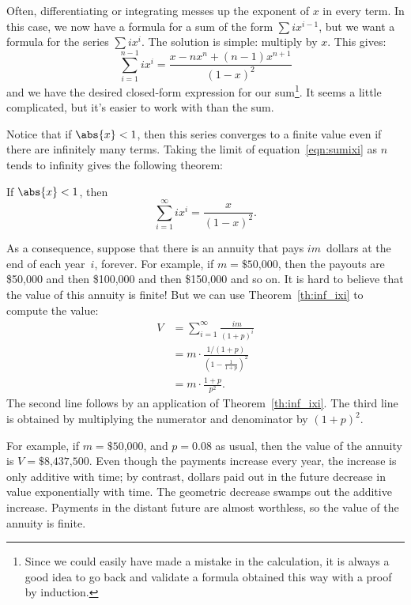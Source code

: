 Often, differentiating or integrating messes up the exponent of $x$ in
every term.  In this case, we now have a formula for a sum of the form
$\sum i x^{i-1}$, but we want a formula for the series $\sum i x^i$.
The solution is simple: multiply by $x$.  This gives:
\begin{equation}\label{eqn:sumixi}
    \sum_{i=1}^{n - 1} i x^i = \frac{ x - n x^n + (n - 1) x^{n+1}}{(1 - x)^2}
\end{equation}
and we have the desired closed-form expression for our
sum\footnote{Since we could easily have made a mistake in the
  calculation, it is always a good idea to go back and validate a
  formula obtained this way with a proof by induction.}.  It seems a
little complicated, but it's easier to work with than the sum.

Notice that if $\abs{x} < 1$, then this series converges to a finite
value even if there are infinitely many terms.  Taking the limit of
equation~\ref{eqn:sumixi} as $n$ tends to infinity gives the following
theorem:
\begin{theorem}\label{th:inf_ixi}
If $\abs{x} < 1$, then
\begin{equation}\label{eqn:inf_ixi}
    \sum_{i=1}^\infty i x^i = \frac{x}{(1-x)^2}.
\end{equation}
\end{theorem}

As a consequence, suppose that there is an annuity that pays
$im$~dollars at the end of each year~$i$, forever.  For example,
if $m = \text{\$50,000}$, then the payouts are \$50,000 and then
\$100,000 and then \$150,000 and so on.  It is hard to believe
that the value of this annuity is finite!  But we can use
Theorem~\ref{th:inf_ixi} to compute the value:
\begin{align*}
V & = \sum_{i=1}^\infty \frac{im}{(1+p)^i} \\
  & = m \cdot \frac{1/(1+p)}{(1 - \frac{1}{1+p})^2} \\
  & = m \cdot \frac{1+p}{p^2}.
\end{align*}
The second line follows by an application of Theorem~\ref{th:inf_ixi}.
The third line is obtained by multiplying the numerator and
denominator by $(1+p)^2$.

For example, if $m = \text{\$50,000}$, and $p = 0.08$ as usual, then
the value of the annuity is $V = \text{\$8,437,500}$.  Even though the
payments increase every year, the increase is only additive with time;
by contrast, dollars paid out in the future decrease in value
exponentially with time.  The geometric decrease swamps out the
additive increase.  Payments in the distant future are almost
worthless, so the value of the annuity is finite.

